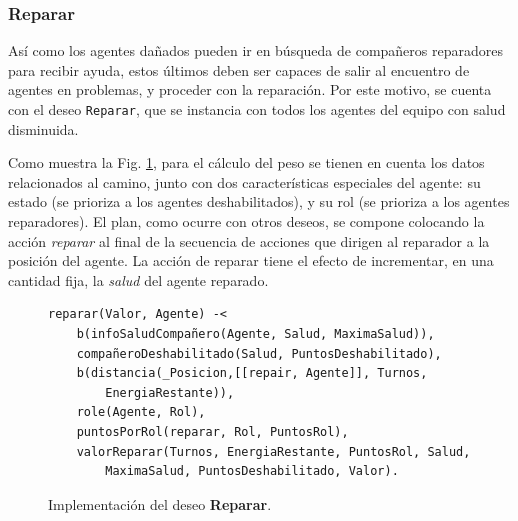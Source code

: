 \documentclass[oneside]{book}
\theoremstyle{definition}
\theoremstyle{example}
\begin{document}
\subsubsection{Reparar}

Así como los agentes dañados pueden ir en búsqueda de compañeros reparadores para recibir ayuda,
estos últimos deben ser capaces de salir al encuentro de agentes en problemas, y proceder con la 
reparación. Por este motivo, se cuenta con el deseo \texttt{Reparar}, que se instancia con todos 
los agentes del equipo con salud disminuida.

Como muestra la Fig. \ref{fig:deseoReparar}, para el cálculo del peso se tienen en cuenta los datos
relacionados al camino, junto con dos características especiales del agente: su estado (se prioriza 
a los agentes deshabilitados), y su rol (se prioriza a los agentes reparadores). El plan, como 
ocurre con otros deseos, se compone colocando la acción \textit{reparar} al final de la secuencia 
de acciones que dirigen al reparador a la posición del agente. La acción de reparar tiene el efecto 
de incrementar, en una cantidad fija, la \textit{salud} del agente reparado. 

\begin{figure}
\begin{verbatim}
reparar(Valor, Agente) -<
	b(infoSaludCompañero(Agente, Salud, MaximaSalud)),
	compañeroDeshabilitado(Salud, PuntosDeshabilitado),
    b(distancia(_Posicion,[[repair, Agente]], Turnos, 
    	EnergiaRestante)),
    role(Agente, Rol),
	puntosPorRol(reparar, Rol, PuntosRol),
    valorReparar(Turnos, EnergiaRestante, PuntosRol, Salud, 
	    MaximaSalud, PuntosDeshabilitado, Valor).
\end{verbatim}
\caption{Implementación del deseo \textbf{Reparar}.}
\label{fig:deseoReparar}
\end{figure}

%
%


\end{document}
